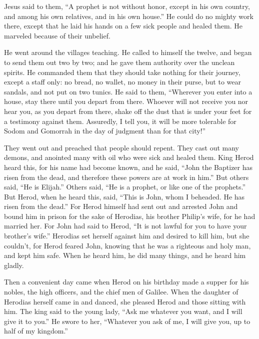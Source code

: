  Jesus said to them, ``A prophet is not without honor,
except in his own country, and among his own relatives, and in his own
house.''  He could do no mighty work there, except that he
laid his hands on a few sick people and healed them.  He
marveled because of their unbelief.

He went around the villages teaching.  He called to himself
the twelve, and began to send them out two by two; and he gave them
authority over the unclean spirits.  He commanded them that
they should take nothing for their journey, except a staff only: no
bread, no wallet, no money in their purse,  but to wear
sandals, and not put on two tunics.  He said to them,
``Wherever you enter into a house, stay there until you depart from
there.  Whoever will not receive you nor hear you, as you
depart from there, shake off the dust that is under your feet for a
testimony against them. Assuredly, I tell you, it will be more tolerable
for Sodom and Gomorrah in the day of judgment than for that city!''

 They went out and preached that people should repent.
 They cast out many demons, and anointed many with oil who
were sick and healed them.  King Herod heard this, for his
name had become known, and he said, ``John the Baptizer has risen from
the dead, and therefore these powers are at work in him.'' 
But others said, ``He is Elijah.'' Others said, ``He is a prophet, or
like one of the prophets.''  But Herod, when he heard this,
said, ``This is John, whom I beheaded. He has risen from the dead.''
 For Herod himself had sent out and arrested John and bound
him in prison for the sake of Herodias, his brother Philip's wife, for
he had married her.  For John had said to Herod, ``It is
not lawful for you to have your brother's wife.''  Herodias
set herself against him and desired to kill him, but she couldn't,
 for Herod feared John, knowing that he was a righteous and
holy man, and kept him safe. When he heard him, he did many things, and
he heard him gladly.

 Then a convenient day came when Herod on his birthday made
a supper for his nobles, the high officers, and the chief men of
Galilee.  When the daughter of Herodias herself came in and
danced, she pleased Herod and those sitting with him. The king said to
the young lady, ``Ask me whatever you want, and I will give it to you.''
 He swore to her, ``Whatever you ask of me, I will give
you, up to half of my kingdom.''

